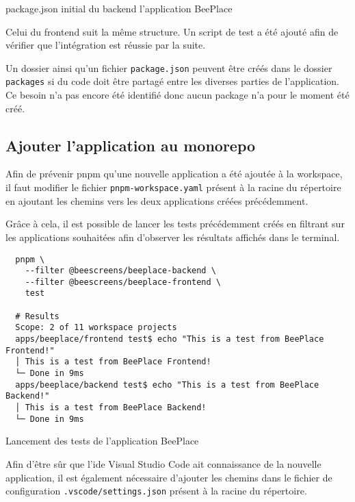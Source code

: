 \begin{listing}[h]
  \inputminted[tabsize=4]{json}{assets/figures/package.json}
  \caption{package.json initial du backend l'application BeePlace}
  \label{listing:beeplace-backend-package-json}
\end{listing}

Celui du frontend suit la même structure. Un script de test a été ajouté afin de vérifier que l'intégration est réussie par la suite.

Un dossier ainsi qu'un fichier \texttt{package.json} peuvent être créés dans le dossier \texttt{packages} si du code doit être partagé entre les diverses parties de l'application. Ce besoin n'a pas encore été identifié donc aucun package n'a pour le moment été créé.

\subsection{Ajouter l'application au monorepo}

Afin de prévenir \gls{pnpm} qu'une nouvelle application a été ajoutée à la workspace, il faut modifier le fichier \texttt{pnpm-workspace.yaml} présent à la racine du répertoire en ajoutant les chemins vers les deux applications créées précédemment.


Grâce à cela, il est possible de lancer les tests précédemment créés en filtrant sur les applications souhaitées afin d'observer les résultats affichés dans le terminal.

\begin{listing}[h]
  \begin{verbatim}
  pnpm \
    --filter @beescreens/beeplace-backend \
    --filter @beescreens/beeplace-frontend \
    test

  # Results
  Scope: 2 of 11 workspace projects
  apps/beeplace/frontend test$ echo "This is a test from BeePlace Frontend!"
  │ This is a test from BeePlace Frontend!
  └─ Done in 9ms
  apps/beeplace/backend test$ echo "This is a test from BeePlace Backend!"
  │ This is a test from BeePlace Backend!
  └─ Done in 9ms
\end{verbatim}
  \caption{Lancement des tests de l'application BeePlace}
  \label{listing:beeplace-tests}
\end{listing}

Afin d'être sûr que l'\gls{ide} Visual Studio Code ait connaissance de la nouvelle application, il est également nécessaire d'ajouter les chemins dans le fichier de configuration \texttt{.vscode/settings.json} présent à la racine du répertoire.

